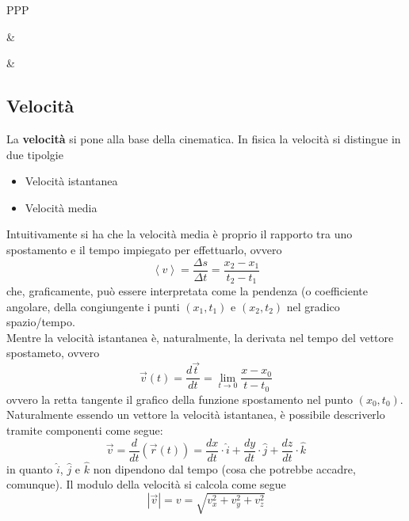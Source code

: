 \documentclass[a4paper]{extarticle}
\begin{document}
\begin{tabularx}{\textwidth}{PPP}
  {
  } & {
  } & {

  }
\end{tabularx}

\vspace{1em}
\subsection{Velocità}
La \textbf{velocità} si pone alla base della cinematica. In fisica la velocità si distingue in due tipolgie
\begin{itemize}
  \item Velocità istantanea
  \item Velocità media
\end{itemize}
Intuitivamente si ha che la velocità media è proprio il rapporto tra uno spostamento e il tempo impiegato per effettuarlo, ovvero
\[\left<v\right> = \frac{\Delta s}{\Delta t} = \frac{x_2 - x_1}{t_2 - t_1}\]
che, graficamente, può essere interpretata come la pendenza (o coefficiente angolare, della congiungente i punti $(x_1,t_1)$ e $(x_2,t_2)$ nel gradico spazio/tempo.\\
Mentre la velocità istantanea è, naturalmente, la derivata nel tempo del vettore spostameto, ovvero
\[\vec{v}(t) = \frac{d\vec{t}}{dt} = \lim_{t \to 0} \frac{x - x_0}{t - t_0}\]
ovvero la retta tangente il grafico della funzione spostamento nel punto $(x_0,t_0)$. Naturalmente essendo un vettore la velocità istantanea, è possibile descriverlo tramite componenti come segue:
\[\vec{v} = \frac{d}{dt} \left(\vec{r}(t)\right) = \frac{dx}{dt} \cdot \hat{i} + \frac{dy}{dt} \cdot \hat{j} + \frac{dz}{dt} \cdot \hat{k}\]
in quanto $\hat{i}$, $\hat{j}$ e $\hat{k}$ non dipendono dal tempo (cosa che potrebbe accadre, comunque). Il modulo della velocità si calcola come segue
\[\left \vert \vec{v} \right \vert = v = \sqrt{v_x^2 + v_y^2 + v_z^2}\]
\end{document}
